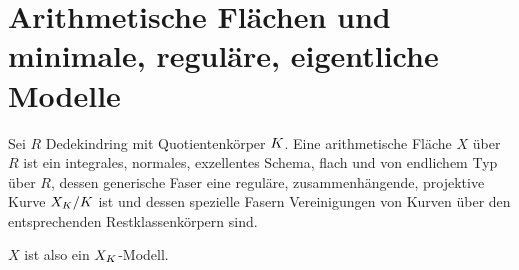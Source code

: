 \documentclass[german]{scrreprt}
\begin{document}

\section{Arithmetische Flächen und minimale, reguläre, eigentliche Modelle}
\begin{Definition}
  Sei $R$ Dedekindring mit Quotientenkörper $K$.
  Eine arithmetische Fläche $X$ über $R$ ist ein
  integrales, normales, exzellentes Schema, flach und von endlichem
  Typ über $R$,
  dessen generische Faser eine reguläre, zusammenhängende,
  projektive Kurve $X_{K}/K$ ist
  und dessen spezielle Fasern Vereinigungen von Kurven über den
  entsprechenden Restklassenkörpern sind.
  \cite[IV.4]{silverman2}
  
  $X$ ist also ein $X_{K}$-Modell.
\end{Definition}
\end{document}
